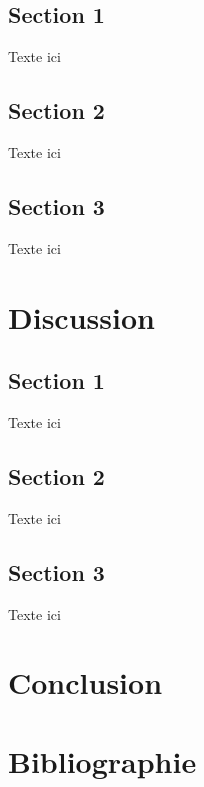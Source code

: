 \documentclass[9pt,twocolumn,twoside,]{pnas-new}
\begin{document}
\hypertarget{section-1-1}{%
\subsection{Section 1}\label{section-1-1}}

Texte ici

\hypertarget{section-2-1}{%
\subsection{Section 2}\label{section-2-1}}

Texte ici

\hypertarget{section-3-1}{%
\subsection{Section 3}\label{section-3-1}}

Texte ici

\hypertarget{discussion}{%
\section{Discussion}\label{discussion}}

\hypertarget{section-1-2}{%
\subsection{Section 1}\label{section-1-2}}

Texte ici

\hypertarget{section-2-2}{%
\subsection{Section 2}\label{section-2-2}}

Texte ici

\hypertarget{section-3-2}{%
\subsection{Section 3}\label{section-3-2}}

Texte ici

\hypertarget{conclusion}{%
\section{Conclusion}\label{conclusion}}

\hypertarget{bibliographie}{%
\section{Bibliographie}\label{bibliographie}}
\end{document}
